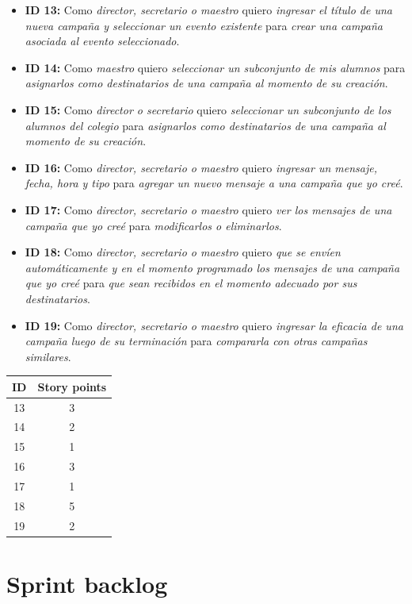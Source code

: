 \documentclass[a4paper, 10pt, twoside]{article}
\newenvironment{stories}{
  \begin{itemize}
}{
  \end{itemize}
}
\newcommand{\story}[4]{
  \item
  \textbf{ID #1:} Como \emph{#2} quiero \emph{#3} para \emph{#4}.
}
\begin{document}
\begin{stories}
  \story{13}{director, secretario o maestro}
        {ingresar el título de una nueva campaña y seleccionar un evento existente}
        {crear una campaña asociada al evento seleccionado}

  \story{14}{maestro}
        {seleccionar un subconjunto de mis alumnos}
        {asignarlos como destinatarios de una campaña al momento de su creación}

  \story{15}{director o secretario}
        {seleccionar un subconjunto de los alumnos del colegio}
        {asignarlos como destinatarios de una campaña al momento de su creación}

  \story{16}{director, secretario o maestro}
        {ingresar un mensaje, fecha, hora y tipo}
        {agregar un nuevo mensaje a una campaña que yo creé}

  \story{17}{director, secretario o maestro}
        {ver los mensajes de una campaña que yo creé}
        {modificarlos o eliminarlos}

  \story{18}{director, secretario o maestro}
        {que se envíen automáticamente y en el momento programado los mensajes de una campaña que yo creé}
        {que sean recibidos en el momento adecuado por sus destinatarios}

  \story{19}{director, secretario o maestro}
        {ingresar la eficacia de una campaña luego de su terminación}
        {compararla con otras campañas similares}
\end{stories}

\begin{center}
\begin{tabular}{|c|c|}
\hline
ID & Story points\\
\hline
13 & 3\\
14 & 2\\
15 & 1\\
16 & 3\\
17 & 1\\
18 & 5\\
19 & 2\\
\hline
\end{tabular}
\end{center}




\newpage
\section{Sprint backlog}
\end{document}
